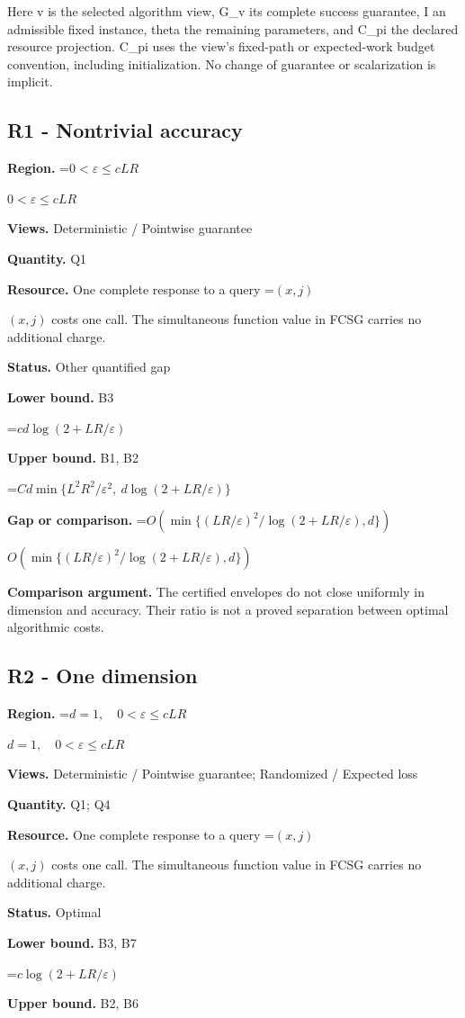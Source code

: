 \documentclass[10pt,a4paper]{article}
\newcommand{\AtlasMath}[1]{\par\begingroup\centering\setbox0=\hbox{$\displaystyle #1$}\ifdim\wd0>1.4\linewidth\typeout{ATLAS WIDE FORMULA: \the\wd0}\fi\ifdim\wd0>\linewidth\resizebox{\linewidth}{!}{\box0}\else\box0\fi\par\endgroup}
\newcommand{\AtlasInlineMath}[1]{\begingroup\setbox0=\hbox{$#1$}\ifdim\wd0>.4\linewidth\endgroup\AtlasMath{#1}\else\endgroup$#1$\fi}
\begin{document}
Here v is the selected algorithm view, G\_v its complete success guarantee, I an admissible fixed instance, theta the remaining parameters, and C\_pi the declared resource projection. C\_pi uses the view's fixed-path or expected-work budget convention, including initialization. No change of guarantee or scalarization is implicit.

\subsection{R1 - Nontrivial accuracy}
\textbf{Region.} \AtlasInlineMath{0<\varepsilon\le cLR}

\textbf{Views.} Deterministic / Pointwise guarantee

\textbf{Quantity.} Q1

\textbf{Resource.} One complete response to a query \AtlasInlineMath{(x,j)} costs one call. The simultaneous function value in FCSG carries no additional charge.

\textbf{Status.} Other quantified gap

\textbf{Lower bound.} B3

\AtlasMath{cd\log(2+LR/\varepsilon)}
\textbf{Upper bound.} B1, B2

\AtlasMath{Cd\min\{L^2R^2/\varepsilon^2,\ d\log(2+LR/\varepsilon)\}}
\textbf{Gap or comparison.} \AtlasInlineMath{O\!\left(\min\{(LR/\varepsilon)^2/\log(2+LR/\varepsilon),d\}\right)}

\textbf{Comparison argument.} The certified envelopes do not close uniformly in dimension and accuracy. Their ratio is not a proved separation between optimal algorithmic costs.

\subsection{R2 - One dimension}
\textbf{Region.} \AtlasInlineMath{d=1,\quad0<\varepsilon\le cLR}

\textbf{Views.} Deterministic / Pointwise guarantee; Randomized / Expected loss

\textbf{Quantity.} Q1; Q4

\textbf{Resource.} One complete response to a query \AtlasInlineMath{(x,j)} costs one call. The simultaneous function value in FCSG carries no additional charge.

\textbf{Status.} Optimal

\textbf{Lower bound.} B3, B7

\AtlasMath{c\log(2+LR/\varepsilon)}
\textbf{Upper bound.} B2, B6
\end{document}
